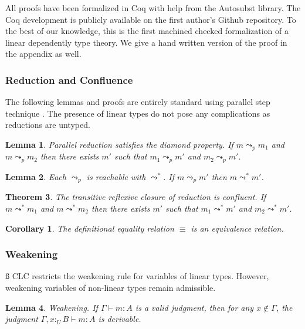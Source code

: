 \documentclass[sigplan,screen,review,authordraft]{acmart}
\newtheorem{theorem}{Theorem}[section]
\newtheorem{corollary}{Corollary}[theorem]
\newtheorem{lemma}[theorem]{Lemma}
\theoremstyle{definition}
\newcommand{\utype}{:_{\scriptscriptstyle U}}
\newcommand{\step}{\leadsto}
\newcommand{\pstep}{\leadsto}
\begin{document}
  All proofs have been formalized in Coq with help from the Autosubst \cite{autosubst} library. The Coq development is publicly available on the first author's Github repository. To the best of our knowledge, this is the first machined checked formalization of a linear dependently type theory. We give a hand written version of the proof in the appendix as well.

  \subsubsection{Reduction and Confluence}

  The following lemmas and proofs are entirely standard using parallel step technique \cite{takahashi}. The presence of linear types do not pose any complications as reductions are untyped.

  \begin{lemma} 
    Parallel reduction satisfies the diamond property. If $m \pstep_p m_1$ and $m \pstep_p m_2$ then there exists $m'$ such that $m_1 \pstep_p m'$ and $m_2 \pstep_p m'$.
  \end{lemma}

  \begin{lemma} 
    Each $\pstep_p$ is reachable with $\step^*$. If $m \pstep_p m'$ then $m \step^* m'$.
  \end{lemma}

  \begin{theorem} 
    The transitive reflexive closure of reduction is confluent. If $m \step^* m_1$ and $m \step^* m_2$ then there exists $m'$ such that $m_1 \pstep^* m'$ and $m_2 \pstep^* m'$.
  \end{theorem}

  \begin{corollary}
    The definitional equality relation $\equiv$ is an equivalence relation.
  \end{corollary}

  \subsubsection{Weakening} \label{weakening}ß
  CLC restricts the weakening rule for variables of linear types. However, weakening variables of non-linear types remain admissible.

  \begin{lemma} 
    Weakening. If $\Gamma \vdash m : A$ is a valid judgment, then for any $x \notin \Gamma$, the judgment $\Gamma, x \utype B \vdash m : A$ is derivable.
  \end{lemma}
\end{document}
